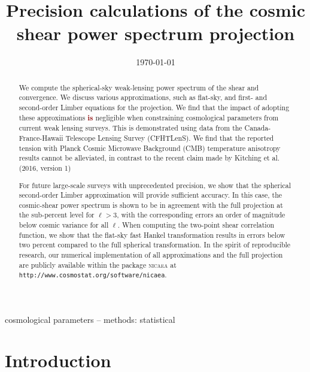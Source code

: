 \documentclass[fleqn,usenatbib]{mnras} %
\title[Precision calculations of the cosmic shear projection]{Precision calculations of the cosmic shear power spectrum projection}
\date{\today}
\newcommand{\forref}[1]{{\bf\textcolor{darkred}{#1}}}
\begin{document}
\setlength{\voffset}{-12mm}

\label{firstpage}


\maketitle
\begin{abstract}

We compute the spherical-sky weak-lensing power spectrum of the shear and
convergence. We discuss various approximations, such as flat-sky, and first- and
second-order Limber equations for the projection. We find that the impact of
adopting these approximations \forref{is} negligible when constraining cosmological
parameters from current weak lensing surveys.
%
This is demonstrated using data from the Canada-France-Hawaii Telescope Lensing Survey
(CFHTLenS). We find that the reported tension with Planck Cosmic Microwave
Background (CMB) temperature anisotropy results cannot be alleviated, in
contrast to the recent claim made by Kitching et al. (2016, version 1)


For future large-scale surveys with unprecedented precision, we show that the
spherical second-order Limber approximation will provide sufficient accuracy.
In this case, the cosmic-shear power spectrum is shown to be in agreement with
the full projection at the sub-percent level for $\ell > 3$, with the
corresponding errors an order of magnitude below cosmic variance for all
$\ell$. When computing the two-point shear correlation function, we show that
the flat-sky fast Hankel transformation results in errors below two percent
compared to the full spherical transformation.
%
In the spirit of reproducible research, our numerical implementation of all
approximations and the full projection are publicly available within the
package \textsc{nicaea} at \texttt{http://www.cosmostat.org/software/nicaea}.

\end{abstract}

\begin{keywords}
cosmological parameters -- methods: statistical
\end{keywords}



\section{Introduction}
\label{sec:intro}
\end{document}
